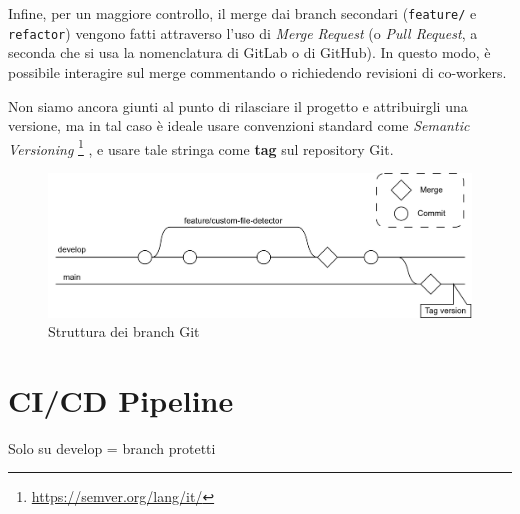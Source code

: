 Infine, per un maggiore controllo, il merge dai branch secondari (\texttt{feature/} e \texttt{refactor}) vengono fatti attraverso l'uso di \emph{Merge Request} (o \emph{Pull Request}, a seconda che si usa la nomenclatura di GitLab o di GitHub).
In questo modo, è possibile interagire sul merge commentando o richiedendo revisioni di co-workers.

Non siamo ancora giunti al punto di rilasciare il progetto e attribuirgli una versione, ma in tal caso è ideale usare convenzioni standard come \emph{Semantic Versioning}
\footnote{\url{https://semver.org/lang/it/}}
, e usare tale stringa come \textbf{tag} sul repository Git.

\begin{figure}[h!]
    \centering
    \includegraphics[width=\textwidth]{assets/git_branches_diagram.png}
    \caption{Struttura dei branch Git}
    \label{fig:git_branches_diagram}
\end{figure}

\section{CI/CD Pipeline}
Solo su develop = branch protetti
